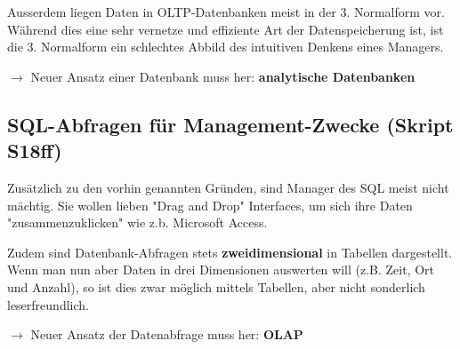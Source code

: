 \documentclass[a4paper, 11pt, nofootinbib]{article}
\begin{document}
Ausserdem liegen Daten in OLTP-Datenbanken meist in der 3. Normalform vor. Während dies eine sehr vernetze und effiziente Art der Datenspeicherung ist, ist die 3. Normalform ein schlechtes Abbild des intuitiven Denkens eines Managers.

$\rightarrow$ Neuer Ansatz einer Datenbank muss her: \textbf{analytische Datenbanken}

\subsection{SQL-Abfragen für Management-Zwecke (Skript S18ff)}
Zusätzlich zu den vorhin genannten Gründen, sind Manager des SQL meist nicht mächtig. Sie wollen lieben "Drag and Drop" Interfaces, um sich ihre Daten "zusammenzuklicken" wie z.b. Microsoft Access.

Zudem sind Datenbank-Abfragen stets \textbf{zweidimensional} in Tabellen dargestellt. Wenn man nun aber Daten in drei Dimensionen auswerten will (z.B. Zeit, Ort und Anzahl), so ist dies zwar möglich mittels Tabellen, aber nicht sonderlich leserfreundlich.

$\rightarrow$ Neuer Ansatz der Datenabfrage muss her: \textbf{OLAP}

\end{document}
